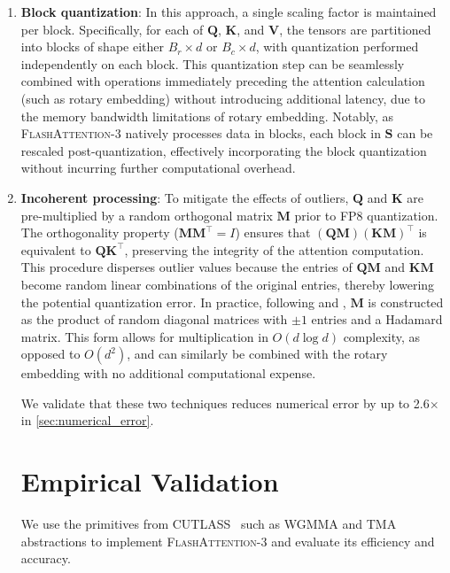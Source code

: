 \begin{enumerate}

\item \textbf{Block quantization}: In this approach, a single scaling factor is maintained per block. Specifically, for each of $\mathbf{Q}$, $\mathbf{K}$, and $\mathbf{V}$, the tensors are partitioned into blocks of shape either $B_r \times d$ or $B_c \times d$, with quantization performed independently on each block. This quantization step can be seamlessly combined with operations immediately preceding the attention calculation (such as rotary embedding) without introducing additional latency, due to the memory bandwidth limitations of rotary embedding. Notably, as \textsc{FlashAttention-3} natively processes data in blocks, each block in $\mathbf{S}$ can be rescaled post-quantization, effectively incorporating the block quantization without incurring further computational overhead.

\item \textbf{Incoherent processing}: To mitigate the effects of outliers, $\mathbf{Q}$ and $\mathbf{K}$ are pre-multiplied by a random orthogonal matrix $\mathbf{M}$ prior to FP8 quantization. The orthogonality property ($\mathbf{M} \mathbf{M}^\top = I$) ensures that $(\mathbf{Q} \mathbf{M}) (\mathbf{K} \mathbf{M})^\top$ is equivalent to $\mathbf{Q} \mathbf{K}^\top$, preserving the integrity of the attention computation. This procedure disperses outlier values because the entries of $\mathbf{Q} \mathbf{M}$ and $\mathbf{K} \mathbf{M}$ become random linear combinations of the original entries, thereby lowering the potential quantization error. In practice, following \citet{chee2024quip} and \citet{tseng2024quip}, $\mathbf{M}$ is constructed as the product of random diagonal matrices with $\pm 1$ entries and a Hadamard matrix. This form allows for multiplication in $O(d \log d)$ complexity, as opposed to $O(d^2)$, and can similarly be combined with the rotary embedding with no additional computational expense.

We validate that these two techniques reduces numerical error by up to 2.6$\times$ in \cref{sec:numerical_error}.

\section{Empirical Validation}
\label{sec:exp}

We use the primitives from CUTLASS~\citep{Thakkar_CUTLASS_2023} such as WGMMA and TMA abstractions to implement \textsc{FlashAttention-3} and evaluate its efficiency and accuracy.


\end{enumerate}
